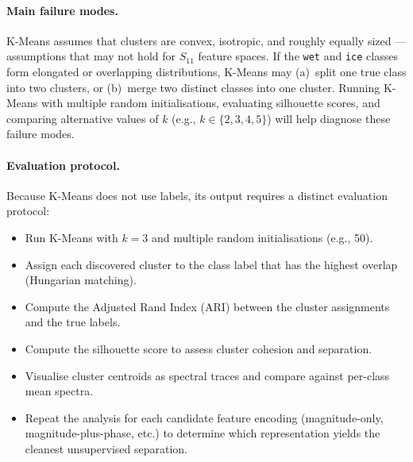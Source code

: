 \paragraph{Main failure modes.}
K-Means assumes that clusters are convex, isotropic, and roughly
equally sized --- assumptions that may not hold for $S_{11}$ feature
spaces.  If the \texttt{wet} and \texttt{ice} classes form elongated
or overlapping distributions, K-Means may (a)~split one true class
into two clusters, or (b)~merge two distinct classes into one cluster.
Running K-Means with multiple random initialisations, evaluating
silhouette scores, and comparing alternative values of $k$ (e.g.,
$k \in \{2, 3, 4, 5\}$) will help diagnose these failure modes.

\paragraph{Evaluation protocol.}
Because K-Means does not use labels, its output requires a distinct
evaluation protocol:
%
\begin{itemize}
  \item Run K-Means with $k = 3$ and multiple random initialisations
        (e.g., \num{50}).
  \item Assign each discovered cluster to the class label that has
        the highest overlap (Hungarian matching).
  \item Compute the Adjusted Rand Index (ARI) between the cluster
        assignments and the true labels.
  \item Compute the silhouette score to assess cluster cohesion and
        separation.
  \item Visualise cluster centroids as spectral traces and compare
        against per-class mean spectra.
  \item Repeat the analysis for each candidate feature encoding
        (magnitude-only, magnitude-plus-phase, etc.) to determine
        which representation yields the cleanest unsupervised
        separation.
\end{itemize}



\bigskip



